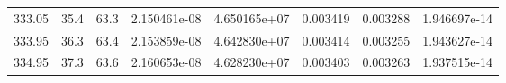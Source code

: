 \documentclass[a4paper,11pt]{article}
\begin{document}
\begin{table}[b]
\begin{tabular}{|c|c|c|c|c|c|c|c|}
            333.05 & 35.4 & 63.3   & 2.150461e-08  & 4.650165e+07 & 0.003419  & 0.003288   &  1.946697e-14 \\
            333.95 & 36.3   & 63.4   & 2.153859e-08 & 4.642830e+07  & 0.003414  & 0.003255   & 1.943627e-14 \\
            334.95 & 37.3   & 63.6   & 2.160653e-08  & 4.628230e+07 &  0.003403  & 0.003263   & 1.937515e-14  \\
            \hline
            \end{tabular}
            \captionsetup{justification=centering, font=footnotesize}
    \end{table}
\end{document}
